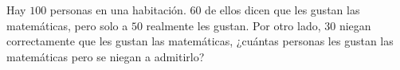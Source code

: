 Hay $100$ personas en una habitación. $60$ de ellos dicen que les gustan las matemáticas, pero solo a $50$ realmente les gustan. Por otro lado, $30$ niegan correctamente que les gustan las matemáticas, ¿cuántas personas les gustan las matemáticas pero se niegan a admitirlo?